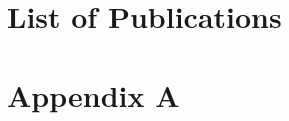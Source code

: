 
% 

\clearpage
{}



\chapter*{List of Publications}


\appendix
\chapter{Appendix A}
\label{ch:appendixa}




